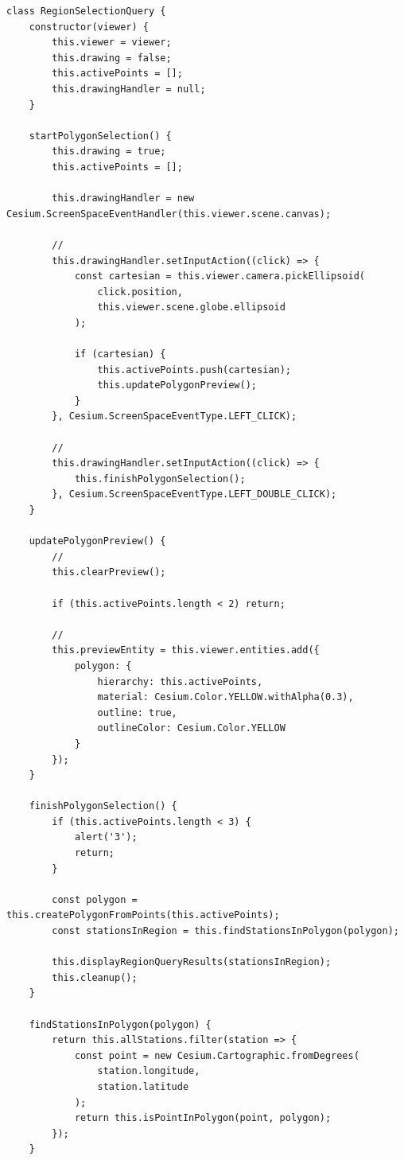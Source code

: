 \begin{lstlisting}[style=javascript]
class RegionSelectionQuery {
    constructor(viewer) {
        this.viewer = viewer;
        this.drawing = false;
        this.activePoints = [];
        this.drawingHandler = null;
    }
    
    startPolygonSelection() {
        this.drawing = true;
        this.activePoints = [];
        
        this.drawingHandler = new Cesium.ScreenSpaceEventHandler(this.viewer.scene.canvas);
        
        // 
        this.drawingHandler.setInputAction((click) => {
            const cartesian = this.viewer.camera.pickEllipsoid(
                click.position,
                this.viewer.scene.globe.ellipsoid
            );
            
            if (cartesian) {
                this.activePoints.push(cartesian);
                this.updatePolygonPreview();
            }
        }, Cesium.ScreenSpaceEventType.LEFT_CLICK);
        
        // 
        this.drawingHandler.setInputAction((click) => {
            this.finishPolygonSelection();
        }, Cesium.ScreenSpaceEventType.LEFT_DOUBLE_CLICK);
    }
    
    updatePolygonPreview() {
        // 
        this.clearPreview();
        
        if (this.activePoints.length < 2) return;
        
        // 
        this.previewEntity = this.viewer.entities.add({
            polygon: {
                hierarchy: this.activePoints,
                material: Cesium.Color.YELLOW.withAlpha(0.3),
                outline: true,
                outlineColor: Cesium.Color.YELLOW
            }
        });
    }
    
    finishPolygonSelection() {
        if (this.activePoints.length < 3) {
            alert('3');
            return;
        }
        
        const polygon = this.createPolygonFromPoints(this.activePoints);
        const stationsInRegion = this.findStationsInPolygon(polygon);
        
        this.displayRegionQueryResults(stationsInRegion);
        this.cleanup();
    }
    
    findStationsInPolygon(polygon) {
        return this.allStations.filter(station => {
            const point = new Cesium.Cartographic.fromDegrees(
                station.longitude,
                station.latitude
            );
            return this.isPointInPolygon(point, polygon);
        });
    }
    

\end{lstlisting}
